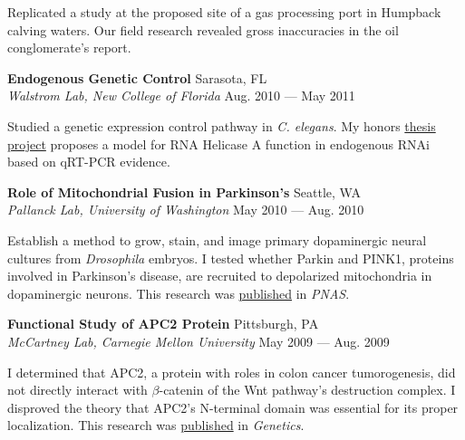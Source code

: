 \documentclass[a4paper,12pt]{article}
\newcommand{\ressubheading}[4]{{\begin{minipage}{\textwidth}
        \textbf{#1} \hfill #2 \\
        \textit{#3} \hfill #4 \\
        \end{minipage}}}
\begin{document}
\vspace{-6pt} Replicated a study at the proposed site of a gas processing port in Humpback calving waters. Our field research revealed gross inaccuracies in the oil conglomerate's report.\\ %

    \ressubheading{Endogenous Genetic Control}{Sarasota, FL}{Walstrom Lab, New College of Florida}{Aug. 2010 --- May 2011}

\vspace{-6pt} Studied a genetic expression control pathway in \emph{C. elegans}. My honors \hyperlink{thesispub}{thesis project} proposes a model for RNA Helicase A function in endogenous RNAi based on qRT-PCR evidence.\\

    

    \ressubheading{Role of Mitochondrial Fusion in Parkinson's}{Seattle, WA}{Pallanck Lab, University of Washington}{May 2010 --- Aug. 2010}
    
\vspace{-6pt} Establish a method to grow, stain, and image primary dopaminergic neural cultures from \textit{Drosophila} embryos. I tested whether Parkin and PINK1, proteins involved in Parkinson's disease, are recruited to depolarized mitochondria in dopaminergic neurons. This research was \hyperlink{neuronpub}{published} in \textit{PNAS}.\\



    \ressubheading{Functional Study of APC2 Protein}{Pittsburgh, PA}{McCartney Lab, Carnegie Mellon University}{May 2009 --- Aug. 2009}
    
\vspace{-6pt} I determined that APC2, a protein  with roles in colon cancer tumorogenesis, did not directly interact with $\beta$-catenin of the Wnt pathway's destruction complex. I disproved the theory that APC2's N-terminal domain was essential for its proper localization. This research was \hyperlink{carnegiepub}{published} in \textit{Genetics}.\\
\end{document}
